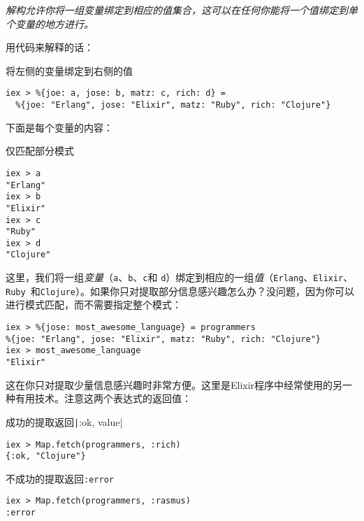 \emph{解构允许你将一组变量绑定到相应的值集合，这可以在任何你能将一个值绑定到单个变量的地方进行。}

用代码来解释的话：

\begin{code}{将左侧的变量绑定到右侧的值}
\begin{verbatim}
iex > %{joe: a, jose: b, matz: c, rich: d} =
  %{joe: "Erlang", jose: "Elixir", matz: "Ruby", rich: "Clojure"}
\end{verbatim}
\label{lst:bind_the_variables_on_the_left_to_the_values_on_the_right}
\end{code}

下面是每个变量的内容：

\begin{code}{仅匹配部分模式}
\begin{verbatim}
iex > a
"Erlang"
iex > b
"Elixir"
iex > c
"Ruby"
iex > d
"Clojure"
\end{verbatim}
\end{code}

这里，我们将一组\emph{变量}（\texttt{a}、\texttt{b}、\texttt{c}和 \texttt{d}）绑定到相应的一组\emph{值}（\texttt{Erlang}、\texttt{Elixir}、\texttt{ Ruby }和\texttt{Clojure}）。如果你只对提取部分信息感兴趣怎么办？没问题，因为你可以进行模式匹配，而不需要指定整个模式：

\begin{code}{}\begin{verbatim}
iex > %{jose: most_awesome_language} = programmers
%{joe: "Erlang", jose: "Elixir", matz: "Ruby", rich: "Clojure"}
iex > most_awesome_language
"Elixir"
\end{verbatim}
\end{code}

这在你只对提取少量信息感兴趣时非常方便。这里是Elixir程序中经常使用的另一种有用技术。注意这两个表达式的返回值：

\begin{code}{成功的提取返回\texttt|{:ok, value}|}
\begin{verbatim}
iex > Map.fetch(programmers, :rich)
{:ok, "Clojure"}
\end{verbatim}
\label{lst:successful_fetch_returns_ok_value}
\end{code}

\begin{code}{不成功的提取返回\texttt{:error}}
\begin{verbatim}
iex > Map.fetch(programmers, :rasmus)
:error
\end{verbatim}
\label{lst:unsuccessful_fetch_returns_error}
\end{code}

